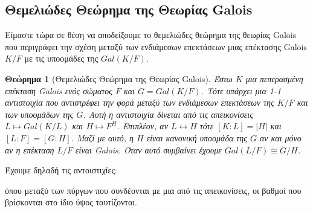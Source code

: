 \documentclass[oneside,a4paper]{article}
\newtheorem{theorem}{Θεώρημα}
\newcommand {\tl}{\textlatin}
\begin{document}
\pagebreak
\subsection{Θεμελιώδες Θεώρημα της Θεωρίας \tl{Galois}}

Είμαστε τώρα σε θέση να αποδείξουμε το θεμελιώδες θεώρημα της θεωρίας \tl{Galois} που περιγράφει την σχέση μεταξύ των ενδιάμεσων επεκτάσεων μιας επέκτασης \tl{Galois} $K/F$ με τις υποομάδες της $Gal(K/F)$.

\begin{theorem}[Θεμελιώδες Θεώρημα της Θεωρίας \tl{Galois}]
	Έστω $K$ μια πεπερασμένη επέκταση \tl{Galois} ενός σώματος $F$ και $G=Gal(K/F)$. Τότε υπάρχει μια 1-1 αντιστοιχία που αντιστρέφει την φορά μεταξύ των ενδιάμεσων επεκτάσεων της $K/F$ και των υποομάδων της $G$. Αυτή η αντιστοιχία δίνεται από τις απεικονίσεις $L \mapsto Gal(K/L)$ και $H \mapsto F^H$. Επιπλέον, αν $L\leftrightarrow H$ τότε $[K:L] = |H|$ και $[L:F] = [G:H]$. Μαζί με αυτό, η $H$ είναι κανονική υποομάδα της $G$ αν και μόνο αν η επέκταση $L/F$ είναι \tl{Galois}. Όταν αυτό συμβαίνει έχουμε $Gal(L/F) \cong G/H$.
\end{theorem}
Έχουμε δηλαδή τις αντοιστιχίες:
\begin{center}
\end{center}
όπου μεταξύ των πύργων που συνδέονται με μια από τις απεικονίσεις, οι βαθμοί που βρίσκονται στο ίδιο ύψος ταυτίζονται.
\end{document}
